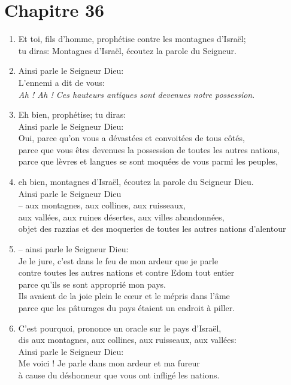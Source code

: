 \documentclass[12pt,a4paper,titlepage]{article}
\def \pslabelsep{0.2em} %
\def \psleftmargin{0em} %
\begin{document}
\section*{Chapitre 36}
\begin{enumerate}[leftmargin=\psleftmargin, labelsep = \pslabelsep, label={\arabic*}, font=\color{\pscolor}\small\textsuperscript, parsep=0em, itemsep=0em, topsep=0em ]
\item Et toi, fils d’homme, prophétise contre les montagnes d’Israël; \\ tu diras: Montagnes d’Israël, écoutez la parole du Seigneur.
\item Ainsi parle le Seigneur Dieu: \\ L’ennemi a dit de vous: \\
\og{}\emph{Ah ! Ah ! Ces hauteurs antiques sont devenues notre possession}.\fg{}
\item Eh bien, prophétise; tu diras: \\ Ainsi parle le Seigneur Dieu: \\ Oui, parce qu’on vous a dévastées et convoitées de tous côtés, \\ parce que vous êtes devenues la possession de toutes les autres nations, \\ parce que lèvres et langues se sont moquées de vous parmi les peuples,
\item eh bien, montagnes d’Israël, écoutez la parole du Seigneur Dieu. \\ Ainsi parle le Seigneur Dieu \\ – aux montagnes, aux collines, aux ruisseaux, \\ aux vallées, aux ruines désertes, aux villes abandonnées, \\ objet des razzias et des moqueries de toutes les autres nations d’alentour 
\item  – ainsi parle le Seigneur Dieu: \\ Je le jure, c’est dans le feu de mon ardeur que je parle \\ contre toutes les autres nations et contre Edom tout entier \\
parce qu’ils se sont approprié mon pays. \\ Ils avaient de la joie plein le cœur et le mépris dans l’âme \\ parce que les pâturages du pays étaient un endroit à piller.
\item  C’est pourquoi, prononce un oracle sur le pays d’Israël, \\ dis aux montagnes, aux collines, aux ruisseaux, aux vallées: \\ Ainsi parle le Seigneur Dieu: \\ Me voici ! Je parle dans mon ardeur et ma fureur \\ à cause du déshonneur que vous ont infligé les nations.

\end{enumerate}
\end{document}
